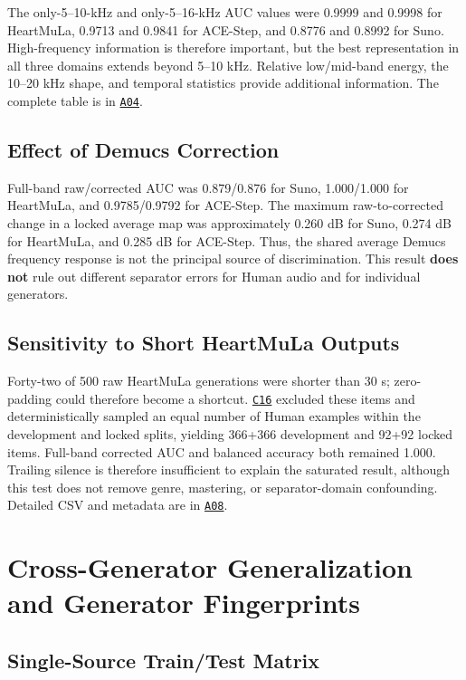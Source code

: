 \documentclass[11pt,a4paper]{article}
\newcommand{\coderef}[1]{\hyperlink{code:#1}{\texttt{#1}}}
\newcommand{\analysisref}[1]{\hyperlink{analysis:#1}{\texttt{#1}}}
\begin{document}
The only-5--10-kHz and only-5--16-kHz AUC values were 0.9999 and 0.9998 for HeartMuLa, 0.9713 and 0.9841 for ACE-Step, and 0.8776 and 0.8992 for Suno. High-frequency information is therefore important, but the best representation in all three domains extends beyond 5--10 kHz. Relative low/mid-band energy, the 10--20 kHz shape, and temporal statistics provide additional information. The complete table is in \analysisref{A04}.

\subsection{Effect of Demucs Correction}

Full-band raw/corrected AUC was 0.879/0.876 for Suno, 1.000/1.000 for HeartMuLa, and 0.9785/0.9792 for ACE-Step. The maximum raw-to-corrected change in a locked average map was approximately 0.260 dB for Suno, 0.274 dB for HeartMuLa, and 0.285 dB for ACE-Step. Thus, the shared average Demucs frequency response is not the principal source of discrimination. This result \textbf{does not} rule out different separator errors for Human audio and for individual generators.

\subsection{Sensitivity to Short HeartMuLa Outputs}

Forty-two of 500 raw HeartMuLa generations were shorter than 30 s; zero-padding could therefore become a shortcut. \coderef{C16} excluded these items and deterministically sampled an equal number of Human examples within the development and locked splits, yielding 366+366 development and 92+92 locked items. Full-band corrected AUC and balanced accuracy both remained 1.000. Trailing silence is therefore insufficient to explain the saturated result, although this test does not remove genre, mastering, or separator-domain confounding. Detailed CSV and metadata are in \analysisref{A08}.

\section{Cross-Generator Generalization and Generator Fingerprints}
\label{sec:cross}

\subsection{Single-Source Train/Test Matrix}
\end{document}
